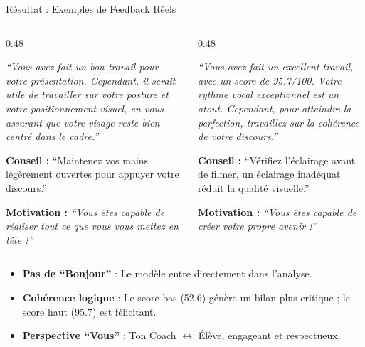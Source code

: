 \documentclass[10pt,aspectratio=169]{beamer}
\begin{document}
\begin{frame}{Résultat : Exemples de Feedback Réels}
    \begin{columns}[T]
        \begin{column}{0.48\textwidth}
            \begin{tcolorbox}[title=Test 6 --- Score : 52.6/100, colframe=warning, colback=warning!3]
                \itshape\scriptsize
                ``Vous avez fait un bon travail pour votre présentation. Cependant, il serait utile de travailler sur votre posture et votre positionnement visuel, en vous assurant que votre visage reste bien centré dans le cadre.''
                
                \vspace{0.15cm}
                \normalfont\textbf{Conseil :} \scriptsize ``Maintenez vos mains légèrement ouvertes pour appuyer votre discours.''
                
                \vspace{0.1cm}
                \textbf{Motivation :} \scriptsize\itshape ``Vous êtes capable de réaliser tout ce que vous vous mettez en tête !''
            \end{tcolorbox}
        \end{column}
        \begin{column}{0.48\textwidth}
            \begin{tcolorbox}[title=Test 5 --- Score : 95.7/100, colframe=success, colback=success!3]
                \itshape\scriptsize
                ``Vous avez fait un excellent travail, avec un score de 95.7/100. Votre rythme vocal exceptionnel est un atout. Cependant, pour atteindre la perfection, travaillez sur la cohérence de votre discours.''
                
                \vspace{0.15cm}
                \normalfont\textbf{Conseil :} \scriptsize ``Vérifiez l'éclairage avant de filmer, un éclairage inadéquat réduit la qualité visuelle.''
                
                \vspace{0.1cm}
                \textbf{Motivation :} \scriptsize\itshape ``Vous êtes capable de créer votre propre avenir !''
            \end{tcolorbox}
        \end{column}
    \end{columns}
    \vspace{0.3cm}
    \begin{itemize} \scriptsize
        \item \textbf{Pas de ``Bonjour''} : Le modèle entre directement dans l'analyse.
        \item \textbf{Cohérence logique} : Le score bas (52.6) génère un bilan plus critique ; le score haut (95.7) est félicitant.
        \item \textbf{Perspective ``Vous''} : Ton Coach $\leftrightarrow$ Élève, engageant et respectueux.
    \end{itemize}
\end{frame}
\end{document}
